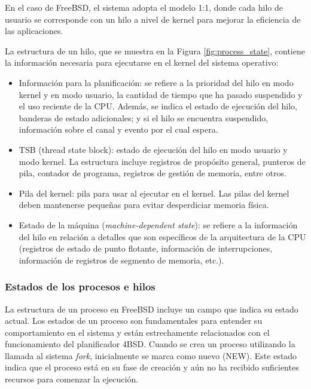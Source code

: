 En el caso de FreeBSD, el sistema adopta el modelo 1:1, donde cada hilo de usuario se corresponde con un hilo a nivel de kernel para mejorar la eficiencia de las aplicaciones.\par

La estructura de un hilo, que se muestra en la Figura \ref{fig:process_state}, contiene la información necesaria para ejecutarse en el kernel del sistema operativo:

\begin{itemize}
    \item Información para la planificación: se refiere a la prioridad del hilo en modo kernel y en modo usuario, la cantidad de tiempo que ha pasado suspendido y el uso reciente de la CPU. Además, se indica el estado de ejecución del hilo, banderas de estado adicionales; y si el hilo se encuentra suspendido, información sobre el canal y evento por el cual espera.
    \item TSB (thread state block): estado de ejecución del hilo en modo usuario y modo kernel. La estructura incluye registros de propósito general, punteros de pila, contador de programa, registros de gestión de memoria, entre otros.
    \item Pila del kernel: pila para usar al ejecutar en el kernel. Las pilas del kernel deben mantenerse pequeñas para evitar desperdiciar memoria física.
    \item Estado de la máquina (\textit{machine-dependent state}): se refiere a la información del hilo en relación a detalles que son específicos de la arquitectura de la CPU (registros de estado de punto flotante, información de interrupciones, información de registros de segmento de memoria, etc.).
\end{itemize}

\subsubsection{Estados de los procesos e hilos}

La estructura de un proceso en FreeBSD incluye un campo que indica su estado actual. Los estados de un proceso son fundamentales para entender su comportamiento en el sistema y están estrechamente relacionados con el funcionamiento del planificador 4BSD. Cuando se crea un proceso utilizando la llamada al sistema \textit{fork}, inicialmente se marca como nuevo (NEW). Este estado indica que el proceso está en su fase de creación y aún no ha recibido suficientes recursos para comenzar la ejecución.

